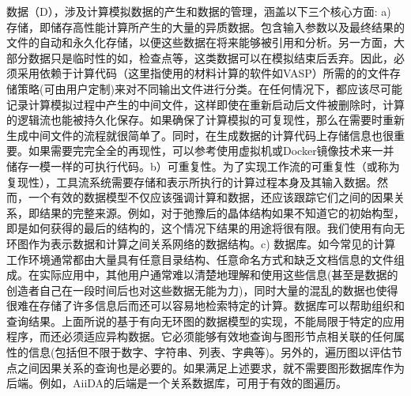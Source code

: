 数据（D），涉及计算模拟数据的产生和数据的管理，涵盖以下三个核心方面: a) 存储，即储存高性能计算所产生的大量的异质数据。包含输入参数以及最终结果的文件的自动和永久化存储，以便这些数据在将来能够被引用和分析。另一方面，大部分数据只是临时性的如，检查点等，这类数据可以在模拟结束后丢弃。因此，必须采用依赖于计算代码（这里指使用的材料计算的软件如VASP）所需的的文件存储策略(可由用户定制)来对不同输出文件进行分类。在任何情况下，都应该尽可能记录计算模拟过程中产生的中间文件，这样即使在重新启动后文件被删除时，计算的逻辑流也能被持久化保存。如果确保了计算模拟的可复现性，那么在需要时重新生成中间文件的流程就很简单了。同时，在生成数据的计算代码上存储信息也很重要。如果需要完完全全的再现性，可以参考使用虚拟机或Docker镜像技术来一并储存一模一样的可执行代码。b）可重复性。为了实现工作流的可重复性（或称为复现性），工具流系统需要存储和表示所执行的计算过程本身及其输入数据。然而，一个有效的数据模型不仅应该强调计算和数据，还应该跟踪它们之间的因果关系，即结果的完整来源。例如，对于弛豫后的晶体结构如果不知道它的初始构型，即是如何获得的最后的结构的，这个情况下结果的用途将很有限。我们使用有向无环图作为表示数据和计算之间关系网络的数据结构。c) 数据库。如今常见的计算工作环境通常都由大量具有任意目录结构、任意命名方式和缺乏文档信息的文件组成。在实际应用中，其他用户通常难以清楚地理解和使用这些信息(甚至是数据的创造者自己在一段时间后也对这些数据无能为力)，同时大量的混乱的数据也使得很难在存储了许多信息后而还可以容易地检索特定的计算。数据库可以帮助组织和查询结果。上面所说的基于有向无环图的数据模型的实现，不能局限于特定的应用程序，而还必须适应异构数据。它必须能够有效地查询与图形节点相关联的任何属性的信息(包括但不限于数字、字符串、列表、字典等)。另外的，遍历图以评估节点之间因果关系的查询也是必要的。如果满足上述要求，就不需要图形数据库作为后端。例如，AiiDA的后端是一个关系数据库，可用于有效的图遍历。

